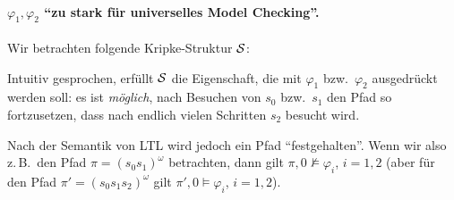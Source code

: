 \documentclass[fontsize=11pt, twoside=false, numbers=autoenddot]{scrbook}
\begin{document}
\paragraph*{{\boldmath $\varphi_1,\varphi_2$ "`zu stark für universelles Model Checking"'.}}
Wir betrachten folgende Kripke-Struktur $\mathcal{S}$:
%
\begin{center}
\end{center}
%
Intuitiv gesprochen, erfüllt $\mathcal{S}$ die Eigenschaft, die mit $\varphi_1$ bzw.\
$\varphi_2$ ausgedrückt werden soll:
es ist \emph{möglich}, nach Besuchen von $s_0$ bzw.\ $s_1$ den Pfad so fortzusetzen,
dass nach endlich vielen Schritten $s_2$ besucht wird.

Nach der Semantik von LTL wird jedoch ein Pfad "`festgehalten"'.
Wenn wir also z.\,B.\ den Pfad $\pi = (s_0s_1)^\omega$ betrachten,
dann gilt $\pi,0 \not\models \varphi_i$, $i=1,2$
(aber für den Pfad $\pi' = (s_0s_1s_2)^\omega$ gilt
$\pi',0 \models \varphi_i$, $i=1,2$).
\end{document}

